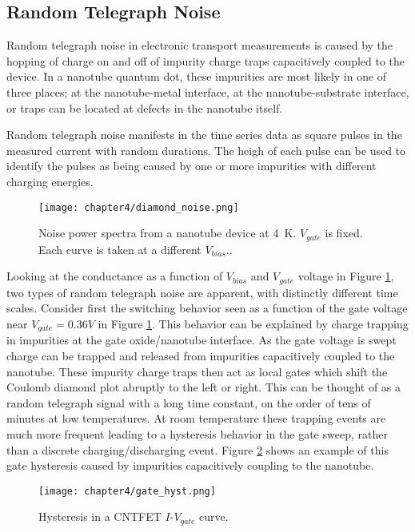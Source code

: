 \subsection{Random Telegraph Noise}
\label{sec:RTN}

Random telegraph noise in electronic transport measurements is caused by the hopping of charge on and off of impurity charge traps capacitively coupled to the device. In a nanotube quantum dot, these impurities are most likely in one of three places; at the nanotube-metal interface, at the nanotube-substrate interface, or traps can be located at defects in the nanotube itself.

Random telegraph noise manifests in the time series data as square pulses in the measured current with random durations. The heigh of each pulse can be used to identify the pulses as being caused by one or more impurities with different charging energies.

\begin{figure}
    \centering
    \texttt{[image: chapter4/diamond\_noise.png]}
    \caption{Noise power spectra from a nanotube device at \SI{4}{\kelvin}. $V_{gate}$ is fixed. Each curve is taken at a different $V_{bias}.$.}
    \label{fig:diamond_noise}
\end{figure}

Looking at the conductance as a function of $V_{bias}$ and $V_{gate}$ voltage in Figure \ref{fig:diamond_noise}, two types of random telegraph noise are apparent, with distinctly different time scales. Consider first the switching behavior seen as a function of the gate voltage near $V_{gate} = 0.36V$ in Figure \ref{fig:diamond_noise}. This behavior can be explained by charge trapping in impurities at the gate oxide/nanotube interface. As the gate voltage is swept charge can be trapped and released from impurities capacitively coupled to the nanotube. These impurity charge traps then act as local gates which shift the Coulomb diamond plot abruptly to the left or right. This can be thought of as a random telegraph signal with a long time constant, on the order of tens of minutes at low temperatures. At room temperature these trapping events are much more frequent leading to a hysteresis behavior in the gate sweep, rather than a discrete charging/discharging event. Figure \ref{fig:gate_hyst} shows an example of this gate hysteresis caused by impurities capacitively coupling to the nanotube.

\begin{figure}
    \centering
    \texttt{[image: chapter4/gate\_hyst.png]}
    \caption{Hysteresis in a CNTFET $I$-$V_{gate}$ curve.}
    \label{fig:gate_hyst}
\end{figure}

